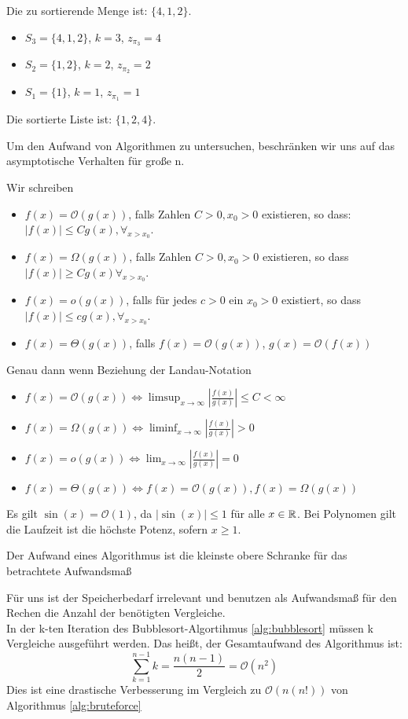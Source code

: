 \begin{example}
Die zu sortierende Menge ist: $\{4,1,2\}$.
\begin{itemize}
	\item $S_3=\{4,1,2\}$, $k=3$, $z_{\pi_3}=4$
	\item $S_2=\{1,2\}$, $k=2$, $z_{\pi_2}=2$
	\item $S_1=\{1\}$, $k=1$, $z_{\pi_1}=1$
\end{itemize}
Die sortierte Liste ist: $\{1,2,4\}$.
\end{example}
Um den Aufwand von Algorithmen zu untersuchen, beschränken wir uns auf das asymptotische Verhalten für große n.
\begin{definition}
Wir schreiben
\begin{itemize}
	\item $f(x)= \mathcal{O}(g(x))$, falls Zahlen $C>0, x_0>0$ existieren, so dass: $|f(x)|\le Cg(x), \forall_{x>x_0}$.
	\item $f(x)=\Omega(g(x))$, falls Zahlen $C>0, x_0>0$ existieren, so dass $|f(x)|\ge Cg(x) \forall_{x>x_0}$.
	\item $f(x)=o(g(x))$, falls für jedes $c>0$ ein $x_0>0$ existiert, so dass 
		$|f(x)|\le cg(x), \forall_{x>x_0}$.
	\item $f(x)= \Theta(g(x))$, falls $f(x)=\mathcal{O}(g(x))$, $g(x)= \mathcal{O}(f(x))$
\end{itemize}
\end{definition}
\begin{remark}
Genau dann wenn Beziehung der Landau-Notation
\begin{itemize}
	\item $f(x)=\mathcal{O}(g(x)) \iff \limsup_{x \to \infty} |\frac{f(x)}{g(x)}|\le C<\infty$
	\item $f(x)= \Omega(g(x)) \iff \liminf_{x \to \infty} |\frac{f(x)}{g(x)}|>0$
	\item $f(x)= o(g(x)) \iff \lim_{x \to \infty} |\frac{f(x)}{g(x)}| =0$
	\item $f(x)= \Theta(g(x)) \iff f(x)= \mathcal{O}(g(x)), f(x)= \Omega(g(x))$
\end{itemize}
\end{remark}
\begin{example}
Es gilt $\sin(x) = \mathcal{O}(1)$, da $|\sin(x)|\le 1$ für alle $x \in  \mathbb{R}$. Bei Polynomen gilt die Laufzeit ist die höchste Potenz, sofern $ x\ge 1$.
\end{example}
\begin{definition}
Der Aufwand eines Algorithmus ist die kleinste obere Schranke für das betrachtete Aufwandsmaß
\end{definition}
Für uns ist der Speicherbedarf irrelevant und benutzen als Aufwandsmaß für den Rechen die Anzahl der benötigten Vergleiche. \\
In der k-ten Iteration des Bubblesort-Algortihmus \ref{alg:bubblesort} müssen k Vergleiche ausgeführt werden. Das heißt, der Gesamtaufwand des Algorithmus ist:
\[
\sum_{k=1}^{n-1}k=\frac{n(n-1)}{2}= \mathcal{O}(n^2)
\]
Dies ist eine drastische Verbesserung im Vergleich zu $\mathcal{O}(n(n!))$ von Algorithmus \ref{alg:bruteforce}
